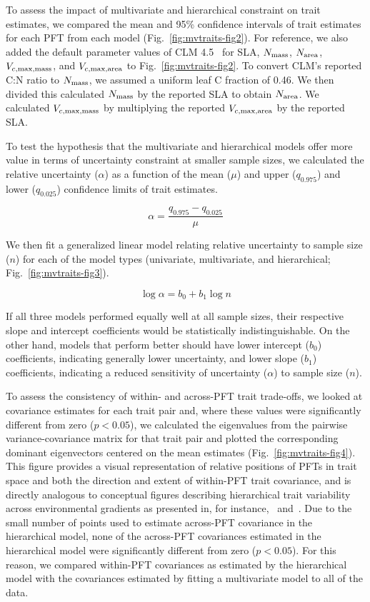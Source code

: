 To assess the impact of multivariate and hierarchical constraint on trait estimates,
we compared the mean and 95\% confidence intervals of trait estimates for each PFT from each model (Fig.~\ref{fig:mvtraits-fig2}).
For reference, we also added the default parameter values of CLM 4.5~\cite[Table 8.1 in ]{clm45_note} for SLA, $N_{\text{mass}}$, $N_{\text{area}}$, $V_{c,\max,\text{mass}}$, and $V_{c,\max,\text{area}}$ to Fig.~\ref{fig:mvtraits-fig2}.
To convert CLM's reported C:N ratio to $N_{\text{mass}}$, we assumed a uniform leaf C fraction of 0.46.
We then divided this calculated $N_{\text{mass}}$ by the reported SLA to obtain $N_{\text{area}}$.
We calculated $V_{c,\max,\text{mass}}$ by multiplying the reported $V_{c,\max,\text{area}}$ by the reported SLA\@.

To test the hypothesis that the multivariate and hierarchical models offer more value in terms of uncertainty constraint at smaller sample sizes, we calculated the relative uncertainty ($\alpha$) as a function of the mean ($\mu$) and upper ($q_{0.975}$) and lower ($q_{0.025}$) confidence limits of trait estimates.

\[ \alpha = \frac{q_{0.975} - q_{0.025}}{\mu} \]

We then fit a generalized linear model relating relative uncertainty to sample size ($n$) for each of the model types (univariate, multivariate, and hierarchical; Fig.~\ref{fig:mvtraits-fig3}).

\[ \log{\alpha} = b_0 + b_1 \log{n} \]

If all three models performed equally well at all sample sizes, their respective slope and intercept coefficients would be statistically indistinguishable.
On the other hand, models that perform better should have
lower intercept ($b_0$) coefficients, indicating generally lower uncertainty,
and
lower slope ($b_1$) coefficients, indicating a reduced sensitivity of uncertainty ($\alpha$) to sample size ($n$).

To assess the consistency of within- and across-PFT trait trade-offs, we looked at covariance estimates for each trait pair and, where these values were significantly different from zero ($p < 0.05$),
we calculated the eigenvalues from the pairwise variance-covariance matrix for that trait pair and plotted the corresponding dominant eigenvectors centered on the mean estimates (Fig.~\ref{fig:mvtraits-fig4}).
This figure provides a visual representation of relative positions of PFTs in trait space and both the direction and extent of within-PFT trait covariance, and is directly analogous to conceptual figures describing hierarchical trait variability across environmental gradients as presented in, for instance,~\cite{cornwell_community_2009} and~\cite{albert_intraspecific_2010}.
Due to the small number of points used to estimate across-PFT covariance in the hierarchical model, none of the across-PFT covariances estimated in the hierarchical model were significantly different from zero ($p < 0.05$).
For this reason, we compared within-PFT covariances as estimated by the hierarchical model with the covariances estimated by fitting a multivariate model to all of the data.

